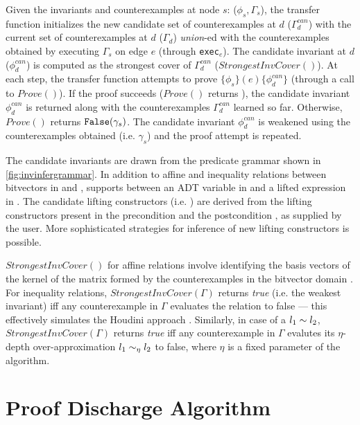 Given the invariants and counterexamples at node $s$: ($\phi_s,\Gamma_s$),
the transfer function initializes the new candidate set of counterexamples at $d$ ($\Gamma^{can}_{d}$)
with the current set of counterexamples at $d$ ($\Gamma_{d}$) {\em union}-ed with
the counterexamples obtained by executing $\Gamma_s$ on edge $e$ (through {\tt exec}$_e$).
The candidate invariant at $d$ ($\phi^{can}_d$) is computed as the strongest cover
of $\Gamma^{can}_{d}$ ($StrongestInvCover()$).
At each step, the transfer function attempts to prove $\{\phi_s\} (e) \{\phi^{can}_d\}$
(through a call to $Prove()$).
If the proof succeeds ($Prove()$ returns ), the candidate invariant $\phi^{can}_d$ is returned along with
the counterexamples $\Gamma^{can}_d$ learned so far.
Otherwise, $Prove()$ returns ${\tt False}(\gamma_s)$.
The candidate invariant $\phi^{can}_d$ is weakened using the counterexamples obtained
(i.e. $\gamma_s$) and the proof attempt is repeated.

The candidate invariants are drawn from the predicate grammar \invgrammar{} shown in \cref{fig:invinfergrammar}.
In addition to affine and inequality relations between bitvectors in \sprog{} and \cprog{},
\invgrammar{} supports \recursiveRelations{} between an ADT variable in \sprog{} and a lifted expression in \cprog{}.
The candidate lifting constructors (i.e. ) are derived from the lifting constructors
present in the precondition \pre{} and the postcondition \post{}, as supplied by the user.
More sophisticated strategies for inference of new lifting constructors is possible.

$StrongestInvCover()$ for affine relations involve
identifying the basis vectors of the kernel of the
matrix formed by the counterexamples in the bitvector
domain \cite{esop05,semalign}.
For inequality relations, $StrongestInvCover(\Gamma)$
returns {\em true} (i.e. the weakest invariant) iff any counterexample in $\Gamma$ evaluates the
relation to false --- this effectively simulates the Houdini approach \cite{houdini}.
Similarly, in case of a \recursiveRelation{} $l_1 \sim{} l_2$, $StrongestInvCover(\Gamma)$
returns {\em true} iff any counterexample in $\Gamma$ evalutes its $\eta$-depth over-approximation
$l_1 \sim_{\eta} l_2$ to false, where $\eta$ is a fixed parameter of the algorithm.

\section{Proof Discharge Algorithm}
\label{sec:proofalgo}

